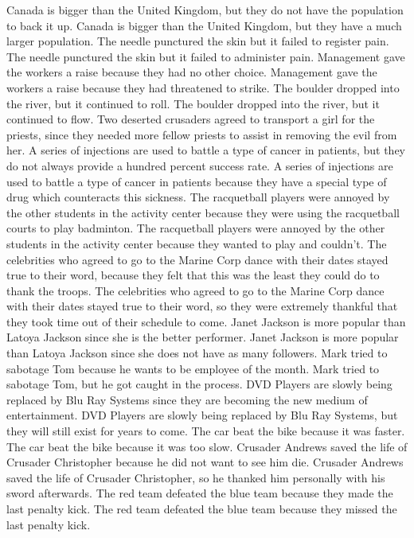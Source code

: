 \documentclass{article}
\begin{document}
\begin{enumerate}
	Canada is bigger than the United Kingdom, but they do not have the population to back it up.
	Canada is bigger than the United Kingdom, but they have a much larger population.
	The needle punctured the skin but it failed to register pain.
	The needle punctured the skin but it failed to administer pain.
	Management gave the workers a raise because they had no other choice.
	Management gave the workers a raise because they had threatened to strike.
	The boulder dropped into the river, but it continued to roll.
	The boulder dropped into the river, but it continued to flow.
	Two deserted crusaders agreed to transport a girl for the priests, since they needed more fellow priests to assist in removing the evil from her.
	A series of injections are used to battle a type of cancer in patients, but they do not always provide a hundred percent success rate.
	A series of injections are used to battle a type of cancer in patients because they have a special type of drug which counteracts this sickness.
	The racquetball players were annoyed by the other students in the activity center because they were using the racquetball courts to play badminton.
	The racquetball players were annoyed by the other students in the activity center because they wanted to play and couldn't.
	The celebrities who agreed to go to the Marine Corp dance with their dates stayed true to their word, because they felt that this was the least they could do to thank the troops.
	The celebrities who agreed to go to the Marine Corp dance with their dates stayed true to their word, so they were extremely thankful that they took time out of their schedule to come.
	Janet Jackson is more popular than Latoya Jackson since she is the better performer.
	Janet Jackson is more popular than Latoya Jackson since she does not have as many followers.
	Mark tried to sabotage Tom because he wants to be employee of the month.
	Mark tried to sabotage Tom, but he got caught in the process.
	DVD Players are slowly being replaced by Blu Ray Systems since they are becoming the new medium of entertainment.
	DVD Players are slowly being replaced by Blu Ray Systems, but they will still exist for years to come.
	The car beat the bike because it was faster.
	The car beat the bike because it was too slow.
	Crusader Andrews saved the life of Crusader Christopher because he did not want to see him die.
	Crusader Andrews saved the life of Crusader Christopher, so he thanked him personally with his sword afterwards.
	The red team defeated the blue team because they made the last penalty kick.
	The red team defeated the blue team because they missed the last penalty kick.

\end{enumerate}
\end{document}
